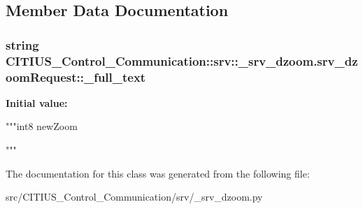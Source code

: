 \subsection{\-Member \-Data \-Documentation}
\hypertarget{class_c_i_t_i_u_s___control___communication_1_1srv_1_1__srv__dzoom_1_1srv__dzoom_request_a20e36f6dfbce05e8adc638902b1b57c0}{
\subsubsection[{\-\_\-full\-\_\-text}]{\setlength{\rightskip}{0pt plus 5cm}string \-C\-I\-T\-I\-U\-S\-\_\-\-Control\-\_\-\-Communication\-::srv\-::\-\_\-srv\-\_\-dzoom.\-srv\-\_\-dzoom\-Request\-::\-\_\-full\-\_\-text}}\label{class_c_i_t_i_u_s___control___communication_1_1srv_1_1__srv__dzoom_1_1srv__dzoom_request_a20e36f6dfbce05e8adc638902b1b57c0}
{\bfseries \-Initial value\-:}
\begin{DoxyCode}
"""int8 newZoom

"""
\end{DoxyCode}


\-The documentation for this class was generated from the following file\-:\begin{DoxyCompactItemize}
\item 
src/\-C\-I\-T\-I\-U\-S\-\_\-\-Control\-\_\-\-Communication/srv/\-\_\-srv\-\_\-dzoom.\-py\end{DoxyCompactItemize}
